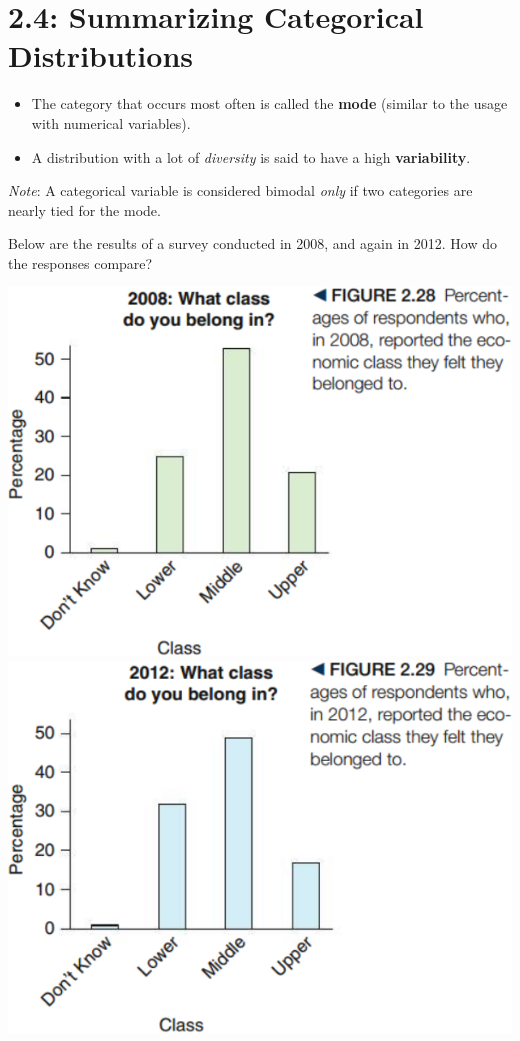 \documentclass[../mathNotesPreamble]{subfiles}
\begin{document}
  \section{2.4: Summarizing Categorical Distributions}
  \begin{defn*}
    \begin{itemize}
      \item The category that occurs most often is called the \textbf{mode} (similar to the usage with numerical variables).
      \item A distribution with a lot of \emph{diversity} is said to have a high \textbf{variability}.
    \end{itemize}
  \end{defn*}

  \emph{Note}: A categorical variable is considered bimodal \emph{only} if two categories are nearly tied for the mode.
  \vspace*{\baselineskip}

  \begin{ex*}
    Below are the results of a survey conducted in 2008, and again in 2012. How do the responses compare?
  \end{ex*}

  \begin{center}
    \includegraphics[width=0.425\linewidth]{images/math211_figure_2p28}
    \includegraphics[width=0.425\linewidth]{images/math211_figure_2p29}
  \end{center}
  \pagebreak
\end{document}
